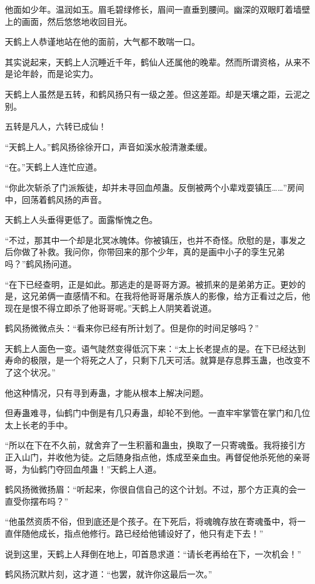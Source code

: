 \begin{this_body}
他面如少年。温润如玉。眉毛碧绿修长，眉间一直垂到腰间。幽深的双眼盯着墙壁上的画面，然后悠悠地收回目光。

天鹤上人恭谨地站在他的面前，大气都不敢喘一口。

其实说起来，天鹤上人沉睡近千年，鹤仙人还属他的晚辈。然而所谓资格，从来不是论年龄，而是论实力。

天鹤上人虽然是五转，和鹤风扬只有一级之差。但这差距。却是天壤之距，云泥之别。

五转是凡人，六转已成仙！

“天鹤上人。”鹤风扬徐徐开口，声音如溪水般清澈柔缓。

“在。”天鹤上人连忙应道。

“你此次斩杀了门派叛徒，却并未寻回血颅蛊。反倒被两个小辈戏耍镇压……”房间中，回荡着鹤风扬的声音。

天鹤上人头垂得更低了。面露惭愧之色。

“不过，那其中一个却是北冥冰魄体。你被镇压，也并不奇怪。欣慰的是，事发之后你做了补救。我问你，你带回来的那个少年，真的是画中小子的孪生兄弟吗？”鹤风扬问道。

“在下已经查明，正是如此。那逃走的是哥哥方源。被抓来的是弟弟方正。更妙的是，这兄弟俩一直感情不和。在我将他哥哥屠杀族人的影像，给方正看过之后，他现在是恨不得立即杀了他哥哥呢。”天鹤上人阴笑着说道。

鹤风扬微微点头：“看来你已经有所计划了。但是你的时间足够吗？”

天鹤上人面色一变。语气陡然变得低沉下来：“太上长老提点的是。在下已经达到寿命的极限，是一个将死之人了，只剩下几天可活。就算是存息葬玉蛊，也改变不了这个状况。”

他这种情况，只有寻到寿蛊，才能从根本上解决问题。

但寿蛊难寻，仙鹤门中倒是有几只寿蛊，却轮不到他。一直牢牢掌管在掌门和几位太上长老的手中。

“所以在下在不久前，就舍弃了一生积蓄和蛊虫，换取了一只寄魂蚤。我将接引方正入山门，并收他为徒。之后随身指点他，炼成至亲血虫。再督促他杀死他的亲哥哥，为仙鹤门夺回血颅蛊！”天鹤上人道。

鹤风扬微微扬眉：“听起来，你很自信自己的这个计划。不过，那个方正真的会一直受你摆布吗？”

“他虽然资质不俗，但到底还是个孩子。在下死后，将魂魄存放在寄魂蚤中，将一直伴随他成长，指点他修行。路已经给他铺设好了，他只有走下去！”

说到这里，天鹤上人拜倒在地上，叩首恳求道：“请长老再给在下，一次机会！”

鹤风扬沉默片刻，这才道：“也罢，就许你这最后一次。”


\end{this_body}
